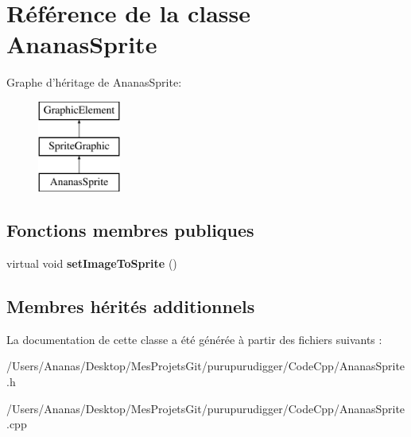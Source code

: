 \hypertarget{class_ananas_sprite}{\section{Référence de la classe Ananas\-Sprite}
\label{class_ananas_sprite}
}
Graphe d'héritage de Ananas\-Sprite\-:\begin{figure}[H]
\begin{center}
\leavevmode
\includegraphics[height=3.000000cm]{class_ananas_sprite}
\end{center}
\end{figure}
\subsection*{Fonctions membres publiques}
\begin{DoxyCompactItemize}
\item 
\hypertarget{class_ananas_sprite_ade2186d7ff94d7d13d4ea771359881d5}{virtual void {\bfseries set\-Image\-To\-Sprite} ()}\label{class_ananas_sprite_ade2186d7ff94d7d13d4ea771359881d5}

\end{DoxyCompactItemize}
\subsection*{Membres hérités additionnels}


La documentation de cette classe a été générée à partir des fichiers suivants \-:\begin{DoxyCompactItemize}
\item 
/\-Users/\-Ananas/\-Desktop/\-Mes\-Projets\-Git/purupurudigger/\-Code\-Cpp/Ananas\-Sprite.\-h\item 
/\-Users/\-Ananas/\-Desktop/\-Mes\-Projets\-Git/purupurudigger/\-Code\-Cpp/Ananas\-Sprite.\-cpp\end{DoxyCompactItemize}
